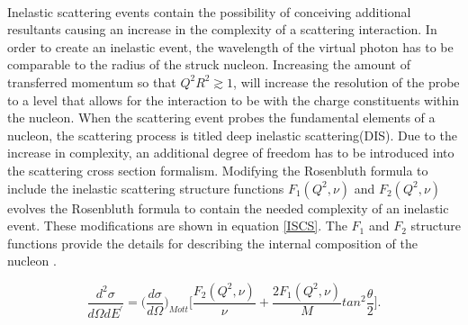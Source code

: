 \paragraph{}Inelastic scattering events contain the possibility of conceiving additional resultants causing an increase in the complexity of a scattering interaction. In order to create an inelastic event, the wavelength of the virtual photon has to be comparable to the radius of the struck nucleon. Increasing the amount of transferred momentum so that $Q^2R^2 \gtrsim 1$, will increase the resolution of the probe to a level that allows for the interaction to be with the charge constituents within the nucleon. When the scattering event probes the fundamental elements of a nucleon, the scattering process is titled deep inelastic scattering(DIS). Due to the increase in complexity, an additional degree of freedom has to be introduced into the scattering cross section formalism. Modifying the Rosenbluth formula to include the inelastic scattering structure functions $F_1(Q^2,\nu)$ and $F_2(Q^2,\nu)$ evolves the Rosenbluth formula to contain the needed complexity of an inelastic event. These modifications are shown in equation \ref{ISCS}. The $F_1$ and $F_2$ structure functions provide the details for describing the internal composition of the nucleon \cite{PnN}. 




\begin{equation}
\label{ISCS}
\frac{d^2\sigma}{d\Omega dE^\prime}=\bigg(\frac{d\sigma}{d\Omega}\bigg)_{Mott} \bigg\lbrack \frac{F_2(Q^2,\nu)}{\nu} + \frac{2F_1(Q^2,\nu)}{M}tan^2\frac{\theta}{2} \bigg \rbrack.
\end{equation}  
